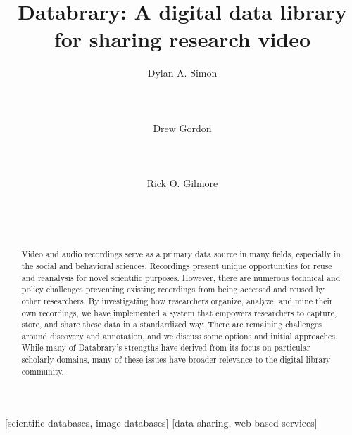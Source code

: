 \documentclass{sig-alternate}
\begin{document}

\title{Databrary: A digital data library for sharing research video}


\author{
\alignauthor
Dylan A. Simon\\
	\\
	\\
	\\
\alignauthor
Drew Gordon\\
	\\
	\\
	\\
\alignauthor
Rick O. Gilmore\\
	\\
	\\
	\\
}

\maketitle

\begin{abstract}
Video and audio recordings serve as a primary data source in many fields, especially in the social and behavioral sciences.
Recordings present unique opportunities for reuse and reanalysis for novel scientific purposes.
However, there are numerous technical and policy challenges preventing existing recordings from being accessed and reused by other researchers.
By investigating how researchers organize, analyze, and mine their own recordings, we have implemented a system that empowers researchers to capture, store, and share these data in a standardized way.
There are remaining challenges around discovery and annotation, and we discuss some options and initial approaches.
While many of Databrary's strengths have derived from its focus on particular scholarly domains, many of these issues have broader relevance to the digital library community.
\end{abstract}

[scientific databases, image databases]
[data sharing, web-based services]
\end{document}
